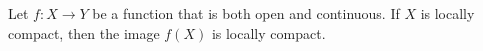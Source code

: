 Let $f: X \to Y$ be a function that is both open and continuous. If $X$ is locally compact, then the image $f(X)$ is locally compact.
